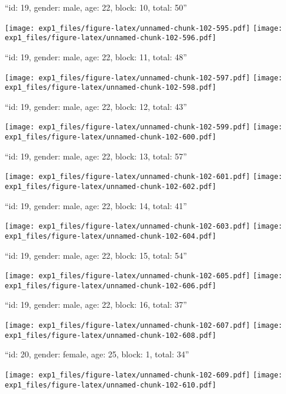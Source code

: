 \documentclass[11pt,,]{article}
\begin{document}
\newpage
[1] 

``id: 19, gender: male, age: 22, block: 10, total: 50''

\texttt{[image: exp1\_files/figure-latex/unnamed-chunk-102-595.pdf]}
\texttt{[image: exp1\_files/figure-latex/unnamed-chunk-102-596.pdf]}

\newpage
[1] 

``id: 19, gender: male, age: 22, block: 11, total: 48''

\texttt{[image: exp1\_files/figure-latex/unnamed-chunk-102-597.pdf]}
\texttt{[image: exp1\_files/figure-latex/unnamed-chunk-102-598.pdf]}

\newpage
[1] 

``id: 19, gender: male, age: 22, block: 12, total: 43''

\texttt{[image: exp1\_files/figure-latex/unnamed-chunk-102-599.pdf]}
\texttt{[image: exp1\_files/figure-latex/unnamed-chunk-102-600.pdf]}

\newpage
[1] 

``id: 19, gender: male, age: 22, block: 13, total: 57''

\texttt{[image: exp1\_files/figure-latex/unnamed-chunk-102-601.pdf]}
\texttt{[image: exp1\_files/figure-latex/unnamed-chunk-102-602.pdf]}

\newpage
[1] 

``id: 19, gender: male, age: 22, block: 14, total: 41''

\texttt{[image: exp1\_files/figure-latex/unnamed-chunk-102-603.pdf]}
\texttt{[image: exp1\_files/figure-latex/unnamed-chunk-102-604.pdf]}

\newpage
[1] 

``id: 19, gender: male, age: 22, block: 15, total: 54''

\texttt{[image: exp1\_files/figure-latex/unnamed-chunk-102-605.pdf]}
\texttt{[image: exp1\_files/figure-latex/unnamed-chunk-102-606.pdf]}

\newpage
[1] 

``id: 19, gender: male, age: 22, block: 16, total: 37''

\texttt{[image: exp1\_files/figure-latex/unnamed-chunk-102-607.pdf]}
\texttt{[image: exp1\_files/figure-latex/unnamed-chunk-102-608.pdf]}

\newpage
[1] 

``id: 20, gender: female, age: 25, block: 1, total: 34''

\texttt{[image: exp1\_files/figure-latex/unnamed-chunk-102-609.pdf]}
\texttt{[image: exp1\_files/figure-latex/unnamed-chunk-102-610.pdf]}
\end{document}
